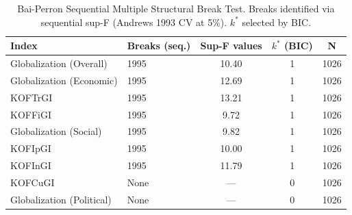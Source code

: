 \begin{table}
\caption{Bai-Perron Sequential Multiple Structural Break Test. Breaks identified via sequential sup-F (Andrews 1993 CV at 5\%). $k^*$ selected by BIC.}
\label{tab:bai_perron_test}
\begin{tabular}{llccc}
\toprule
Index & Breaks (seq.) & Sup-F values & $k^*$ (BIC) & N \\
\midrule
Globalization (Overall) & 1995 & 10.40 & 1 & 1026 \\
Globalization (Economic) & 1995 & 12.69 & 1 & 1026 \\
KOFTrGI & 1995 & 13.21 & 1 & 1026 \\
KOFFiGI & 1995 & 9.72 & 1 & 1026 \\
Globalization (Social) & 1995 & 9.82 & 1 & 1026 \\
KOFIpGI & 1995 & 10.00 & 1 & 1026 \\
KOFInGI & 1995 & 11.79 & 1 & 1026 \\
KOFCuGI & None & --- & 0 & 1026 \\
Globalization (Political) & None & --- & 0 & 1026 \\
\bottomrule
\end{tabular}
\end{table}
